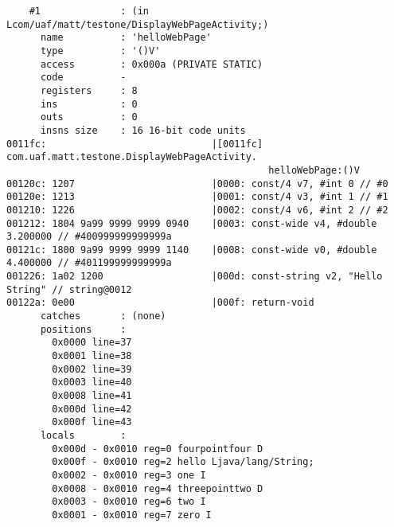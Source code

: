\begin{lstlisting}
    #1              : (in Lcom/uaf/matt/testone/DisplayWebPageActivity;)
      name          : 'helloWebPage'
      type          : '()V'
      access        : 0x000a (PRIVATE STATIC)
      code          -
      registers     : 8
      ins           : 0
      outs          : 0
      insns size    : 16 16-bit code units
0011fc:                             |[0011fc] com.uaf.matt.testone.DisplayWebPageActivity.
                                              helloWebPage:()V
00120c: 1207                        |0000: const/4 v7, #int 0 // #0
00120e: 1213                        |0001: const/4 v3, #int 1 // #1
001210: 1226                        |0002: const/4 v6, #int 2 // #2
001212: 1804 9a99 9999 9999 0940    |0003: const-wide v4, #double 3.200000 // #400999999999999a
00121c: 1800 9a99 9999 9999 1140    |0008: const-wide v0, #double 4.400000 // #401199999999999a
001226: 1a02 1200                   |000d: const-string v2, "Hello String" // string@0012
00122a: 0e00                        |000f: return-void
      catches       : (none)
      positions     :
        0x0000 line=37
        0x0001 line=38
        0x0002 line=39
        0x0003 line=40
        0x0008 line=41
        0x000d line=42
        0x000f line=43
      locals        :
        0x000d - 0x0010 reg=0 fourpointfour D
        0x000f - 0x0010 reg=2 hello Ljava/lang/String;
        0x0002 - 0x0010 reg=3 one I
        0x0008 - 0x0010 reg=4 threepointtwo D
        0x0003 - 0x0010 reg=6 two I
        0x0001 - 0x0010 reg=7 zero I


\end{lstlisting}
